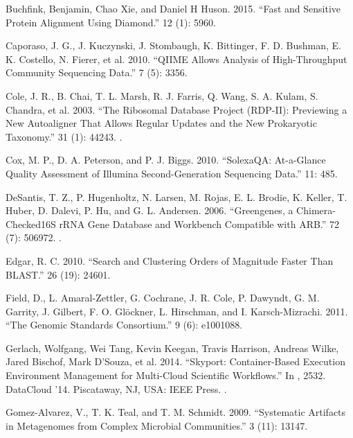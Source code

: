 \documentclass[letterpaper,10pt,english]{sphinxmanual}
\begin{document}
Buchfink, Benjamin, Chao Xie, and Daniel H Huson. 2015. “Fast and
Sensitive Protein Alignment Using Diamond.”  12
(1): 59\textendash{}60.

Caporaso, J. G., J. Kuczynski, J. Stombaugh, K. Bittinger, F. D.
Bushman, E. K. Costello, N. Fierer, et al. 2010. “QIIME Allows
Analysis of High-Throughput Community Sequencing Data.”  7 (5): 335\textendash{}6.

Cole, J. R., B. Chai, T. L. Marsh, R. J. Farris, Q. Wang, S. A.
Kulam, S. Chandra, et al. 2003. “The Ribosomal Database Project
(RDP-II): Previewing a New Autoaligner That Allows Regular Updates
and the New Prokaryotic Taxonomy.”  31
(1): 442\textendash{}43. .

Cox, M. P., D. A. Peterson, and P. J. Biggs. 2010. “SolexaQA:
At-a-Glance Quality Assessment of Illumina Second-Generation
Sequencing Data.”  11: 485.

DeSantis, T. Z., P. Hugenholtz, N. Larsen, M. Rojas, E. L. Brodie,
K. Keller, T. Huber, D. Dalevi, P. Hu, and G. L. Andersen. 2006.
“Greengenes, a Chimera-Checked16S rRNA Gene Database and Workbench
Compatible with ARB.”  72 (7): 5069\textendash{}72.
.

Edgar, R. C. 2010. “Search and Clustering Orders of Magnitude
Faster Than BLAST.”  26 (19): 2460\textendash{}1.

Field, D., L. Amaral-Zettler, G. Cochrane, J. R. Cole, P. Dawyndt,
G. M. Garrity, J. Gilbert, F. O. Glöckner, L. Hirschman, and I.
Karsch-Mizrachi. 2011. “The Genomic Standards Consortium.”  9 (6): e1001088.

Gerlach, Wolfgang, Wei Tang, Kevin Keegan, Travis Harrison,
Andreas Wilke, Jared Bischof, Mark D’Souza, et al. 2014. “Skyport:
Container-Based Execution Environment Management for Multi-Cloud
Scientific Workflows.” In , 25\textendash{}32.
DataCloud ’14. Piscataway, NJ, USA: IEEE Press.
.

Gomez-Alvarez, V., T. K. Teal, and T. M. Schmidt. 2009.
“Systematic Artifacts in Metagenomes from Complex Microbial
Communities.”  3 (11): 1314\textendash{}7.
\end{document}
